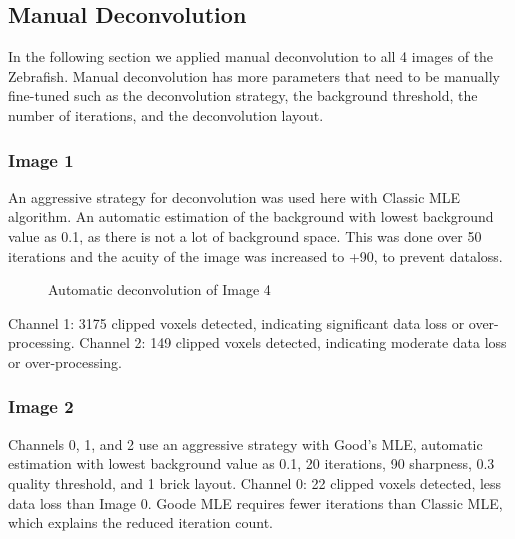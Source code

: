 \documentclass{article}
\begin{document}
\subsection*{Manual Deconvolution}
In the following section we applied manual deconvolution to all 4 images of the Zebrafish. Manual deconvolution has more parameters that need to be manually fine-tuned such as the deconvolution strategy, the background threshold, the number of iterations, and the deconvolution layout. 
\subsubsection*{Image 1}
An aggressive strategy for deconvolution was used here with Classic MLE algorithm. An automatic estimation of the background with lowest background value as 0.1, as there is not a lot of background space. This was done over 50 iterations and the acuity of the image was increased to +90, to prevent dataloss. \newline
\begin{figure}[h!]
\centering
{}
\vspace{5 mm}
\caption{Automatic deconvolution of Image 4}
\label{fig:auto-deconvolve-image4}
\end{figure}
Channel 1: 3175 clipped voxels detected, indicating significant data loss or over-processing. \newline
Channel 2: 149 clipped voxels detected, indicating moderate data loss or over-processing. \newline
\subsubsection*{Image 2}
Channels 0, 1, and 2 use an aggressive strategy with Good's MLE, automatic estimation with lowest background value as 0.1, 20 iterations, 90 sharpness, 0.3 quality threshold, and 1 brick layout. \newline
Channel 0: 22 clipped voxels detected, less data loss than Image 0.\newline
Goode MLE requires fewer iterations than Classic MLE, which explains the reduced iteration count.
\end{document}
